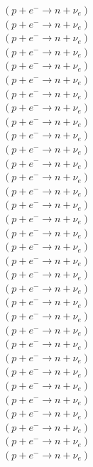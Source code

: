 \documentclass{article}
\begin{document}
\begin{multicols}{3}
$(p + e^{-}\rightarrow n + \nu_{e})$\\
$(p + e^{-}\rightarrow n + \nu_{e})$\\
$(p + e^{-}\rightarrow n + \nu_{e})$\\
$(p + e^{-}\rightarrow n + \nu_{e})$\\
$(p + e^{-}\rightarrow n + \nu_{e})$\\
$(p + e^{-}\rightarrow n + \nu_{e})$\\
$(p + e^{-}\rightarrow n + \nu_{e})$\\
$(p + e^{-}\rightarrow n + \nu_{e})$\\
$(p + e^{-}\rightarrow n + \nu_{e})$\\
$(p + e^{-}\rightarrow n + \nu_{e})$\\
$(p + e^{-}\rightarrow n + \nu_{e})$\\
$(p + e^{-}\rightarrow n + \nu_{e})$\\
$(p + e^{-}\rightarrow n + \nu_{e})$\\
$(p + e^{-}\rightarrow n + \nu_{e})$\\
$(p + e^{-}\rightarrow n + \nu_{e})$\\
$(p + e^{-}\rightarrow n + \nu_{e})$\\
$(p + e^{-}\rightarrow n + \nu_{e})$\\
$(p + e^{-}\rightarrow n + \nu_{e})$\\
$(p + e^{-}\rightarrow n + \nu_{e})$\\
$(p + e^{-}\rightarrow n + \nu_{e})$\\
$(p + e^{-}\rightarrow n + \nu_{e})$\\
$(p + e^{-}\rightarrow n + \nu_{e})$\\
$(p + e^{-}\rightarrow n + \nu_{e})$\\
$(p + e^{-}\rightarrow n + \nu_{e})$\\
$(p + e^{-}\rightarrow n + \nu_{e})$\\
$(p + e^{-}\rightarrow n + \nu_{e})$\\
$(p + e^{-}\rightarrow n + \nu_{e})$\\
$(p + e^{-}\rightarrow n + \nu_{e})$\\
$(p + e^{-}\rightarrow n + \nu_{e})$\\
$(p + e^{-}\rightarrow n + \nu_{e})$\\
$(p + e^{-}\rightarrow n + \nu_{e})$\\
$(p + e^{-}\rightarrow n + \nu_{e})$\\
$(p + e^{-}\rightarrow n + \nu_{e})$\\

\end{multicols}
\end{document}
